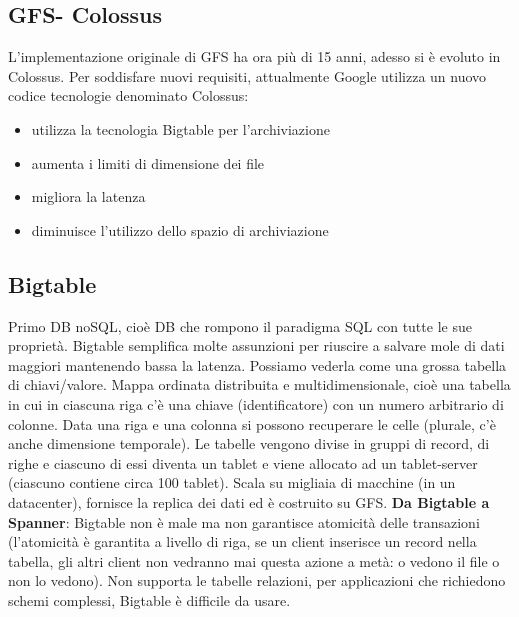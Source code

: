 \documentclass[12pt,italian]{report}
\begin{document}
\subsection{GFS- Colossus}
L'implementazione originale di GFS ha ora più di 15 anni, adesso si è evoluto in Colossus. Per soddisfare nuovi requisiti, attualmente Google utilizza un nuovo codice tecnologie denominato Colossus:
\begin{itemize}
    \item utilizza la tecnologia Bigtable per l'archiviazione
    \item aumenta i limiti di dimensione dei file
    \item migliora la latenza
    \item diminuisce l'utilizzo dello spazio di archiviazione
\end{itemize}

\subsection{Bigtable}
Primo DB noSQL, cioè DB che rompono il paradigma SQL con tutte le sue proprietà. Bigtable semplifica molte assunzioni per riuscire a salvare mole di dati maggiori mantenendo bassa la latenza. Possiamo vederla come una grossa tabella di chiavi/valore. 
\bigbreak
Mappa ordinata distribuita e multidimensionale, cioè una tabella in cui in ciascuna riga c'è una chiave (identificatore) con un numero arbitrario di colonne. Data una riga e una colonna si possono recuperare le celle (plurale, c'è anche dimensione temporale). Le tabelle vengono divise in gruppi di record, di righe e ciascuno di essi diventa un tablet e viene allocato ad un tablet-server (ciascuno contiene circa 100 tablet). 
\bigbreak
Scala su migliaia di macchine (in un datacenter), fornisce la replica dei dati ed è costruito su GFS. 
\bigbreak
\noindent \textbf{Da Bigtable a Spanner}:
Bigtable non è male ma non garantisce atomicità delle transazioni (l'atomicità è garantita a livello di riga, se un client inserisce un record nella tabella, gli altri client non vedranno mai questa azione a metà: o vedono il file o non lo vedono). Non supporta le tabelle relazioni, per applicazioni che richiedono schemi complessi, Bigtable è difficile da usare.
\end{document}
